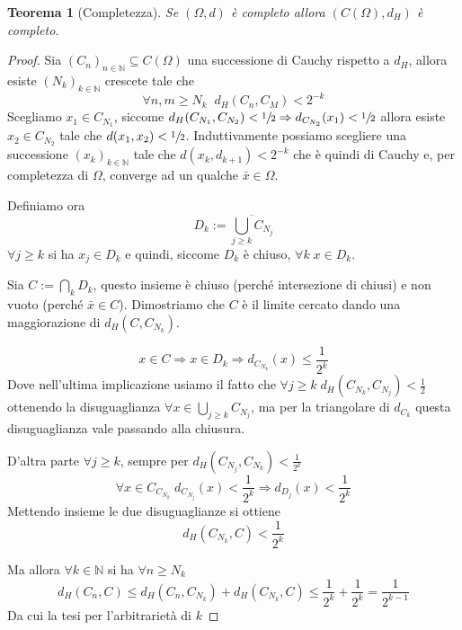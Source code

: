 \documentclass[a4paper,10pt]{article}
\theoremstyle{plain}
\newtheorem{myteo}{Teorema}[section]
\theoremstyle{definition}
\theoremstyle{remark}
\newcommand{\obar}[1]{\overline{#1}}
\newcommand{\pa}[1]{\left(#1\right)}
\begin{document}
\begin{myteo}[Completezza{\cite[Proposizione 4.4.2]{ambrosio2000selected}}]
  Se $(\Omega,d)$ è completo allora $\pa{C(\Omega),d_H}$ è completo.
\end{myteo}
\begin{proof}
  Sia $\pa{C_n}_{n\in \mathbb{N}} \subseteq C(\Omega)$ una successione
  di Cauchy rispetto a $d_H$, allora esiste $\pa{N_k}_{k\in
    \mathbb{N}}$ crescete tale che 
  \[ \forall n,m \ge N_k\;\; d_H(C_n,C_M) < 2^{-k} \] Scegliamo
  $x_1\in C_{N_1}$, siccome $d_H(C_{N_1},C_{N_2}) < \sfrac{1}{2}
  \Rightarrow d_{C_{N_2}}(x_1) < \sfrac{1}{2}$ allora esiste $x_2\in
  C_{N_2}$ tale che $d(x_1,x_2) < \sfrac{1}{2}$. Induttivamente
  possiamo scegliere una successione $\pa{x_k}_{k\in \mathbb{N}}$ tale
  che $d(x_k,d_{k+1})<2^{-k}$ che è quindi di Cauchy e, per
  completezza di $\Omega$, converge ad un qualche $\bar x\in \Omega$.

  Definiamo ora 
  \[ D_k:= \obar{ \bigcup_{j \ge k} C_{N_j}} \]
  $\forall j \ge k$ si ha $x_j\in D_k$ e quindi, siccome $D_k$ è
  chiuso, $\forall k\; x\in D_k$.

  Sia $C:=\bigcap _k D_k$, questo insieme è chiuso (perché
  intersezione di chiusi) e non vuoto (perché $\bar x\in
  C$). Dimostriamo che $C$ è il limite cercato dando una maggiorazione
  di $d_H(C,C_{N_k})$.

  \[ x\in C \Rightarrow x \in D_k \Rightarrow d_{C_{N_k}}(x) \le
  \frac{1}{2^k} \]
  Dove nell'ultima implicazione usiamo il fatto che $\forall j \ge k
  \; d_H(C_{N_k},C_{N_j}) < \frac{1}{2}$ ottenendo la disuguaglianza
  $\forall x \in \bigcup_{j \ge k} C_{N_j}$, ma per la triangolare di
  $d_{C_k}$ questa disuguaglianza vale passando alla chiusura.
  
  D'altra parte $\forall j\ge k$, sempre per $d_H(C_{N_j},C_{N_k}) <
  \frac{1}{2^k}$
  \[ \forall x \in C_{C_{N_k}}\; d_{C_{N_j}}(x) < \frac{1}{2^k}
  \Rightarrow d_{D_{j}}(x) < \frac{1}{2^k} \]
  Mettendo insieme le due disuguaglianze si ottiene
  \[ d_H(C_{N_k},C) < \frac{1}{2^k} \]
  
  Ma allora $\forall k \in \mathbb{N}$ si ha $\forall n \ge N_k$
  \[ d_H(C_n,C) \le d_H(C_n,C_{N_k}) + d_H(C_{N_k},C) \le
  \frac{1}{2^k} + \frac{1}{2^k} = \frac{1}{2^{k-1}} \]
  Da cui la tesi per l'arbitrarietà di $k$
\end{proof}
\end{document}
